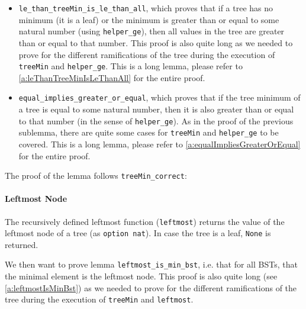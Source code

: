 \documentclass[a4paper]{article}
\begin{document}
\begin{itemize}
\begin{itemize}
        \item \texttt{le\_than\_treeMin\_is\_le\_than\_all}, which proves that if a tree has no minimum (it is a leaf) or the minimum is greater than or equal to some natural number (using \texttt{helper\_ge}), then all values in the tree are greater than or equal to that number. This proof is also quite long as we needed to prove for the different ramifications of the tree during the execution of \texttt{treeMin} and \texttt{helper\_ge}. This is a long lemma, please refer to \autoref{a:leThanTreeMinIsLeThanAll} for the entire proof.
        
        
        \item \texttt{equal\_implies\_greater\_or\_equal}, which proves that if the tree minimum of a tree is equal to some natural number, then it is also greater than or equal to that number (in the sense of \texttt{helper\_ge}). As in the proof of the previous sublemma, there are quite some cases for \texttt{treeMin} and \texttt{helper\_ge} to be covered. This is a long lemma, please refer to \autoref{a:equalImpliesGreaterOrEqual} for the entire proof.
        
    \end{itemize}
\end{itemize}

The proof of the lemma follows \texttt{treeMin\_correct}:


 
\paragraph{Leftmost Node}

The recursively defined leftmost function (\texttt{leftmost}) returns the value of the leftmost node of a tree (as \texttt{option nat}). In case the tree is a leaf, \texttt{None} is returned.



We then want to prove lemma \texttt{leftmost\_is\_min\_bst}, i.e. that for all BSTs, that the minimal element is the leftmost node. This proof is also quite long (see \autoref{a:leftmostIsMinBst}) as we needed to prove for the different ramifications of the tree during the execution of \texttt{treeMin} and \texttt{leftmost}.


\end{document}

